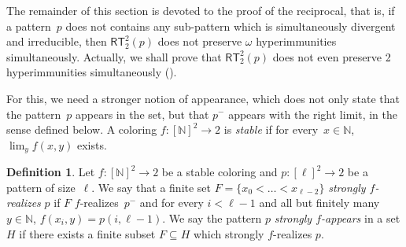 \documentclass{article}
\newcommand{\RT}[0]{\mathsf{RT}}
\newcommand{\NN}[0]{\mathbb{N}}
\def\N{\mathbb{N}}
\def\NN{\mathbb{N}}
\newtheorem{theorem}{Theorem}
\numberwithin{theorem}{section}
\theoremstyle{definition}
\newtheorem{definition}[theorem]{Definition}
\newtheorem{remark}[theorem]{Remark}
\begin{document}
The remainder of this section is devoted to the proof of the reciprocal, that is, if a pattern~$p$ does not contains any sub-pattern which is simultaneously divergent and irreducible, then $\RT^2_2(p)$ does not preserve $\omega$ hyperimmunities simultaneously. Actually, we shall prove that $\RT^2_2(p)$ does not even preserve 2 hyperimmunities simultaneously ().

For this, we need a stronger notion of appearance, which does not only state that the pattern~$p$ appears in the set, but that $p^-$ appears with the right limit, in the sense defined below. A coloring $f : [\NN]^2 \to 2$ is \emph{stable} if for every~$x \in \NN$, $\lim_y f(x, y)$ exists.


\begin{definition}
Let $f : [\NN]^2 \to 2$ be a stable coloring and $p : [\ell]^2 \to 2$ be a pattern of size~$\ell$.
We say that a finite set $F = \{ x_0 < \dots < x_{\ell-2} \}$ \emph{strongly $f$-realizes} $p$ if $F$ $f$-realizes~$p^-$ and for every $i < \ell-1$ and all but finitely many~$y \in \NN$, $f(x_i, y) = p(i, \ell-1)$. 
We say the pattern $p$ \emph{strongly $f$-appears} in a set $H$ if there exists a finite subset $F \subseteq H$ which strongly $f$-realizes $p$.
\end{definition}


\end{document}

